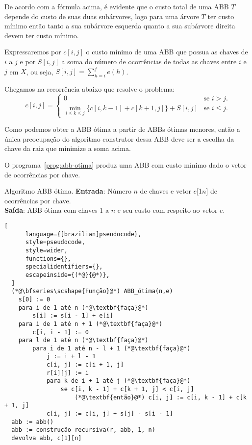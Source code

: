 
De acordo com a fórmula acima, é evidente que o custo total de uma ABB $T$ depende do custo de suas duas subárvores, logo para uma árvore $T$ ter custo mínimo então tanto a sua subárvore esquerda quanto a sua subárvore direita devem ter custo mínimo.

Expressaremos por $c[i,j]$ o custo mínimo de uma ABB que possua as chaves de $i$ a $j$ e por $S[i,j]$ a soma do número de ocorrências de todas as chaves entre $i$ e $j$ em $X$, ou seja, $S[i,j] = \sum_{h=i}^{j} e(h)$. %

Chegamos na recorrência abaixo que resolve o problema:
\[
c[i, j] = 
\begin{cases}
    0 & \text{se } i > j. \\
    \min_{i \leq k \leq j} \{ c[i, k - 1] + c[k + 1, j]\} + S[i, j] & \text{se } i \leq j.
\end{cases}
\]

Como podemos obter a ABB ótima a partir de ABBs ótimas menores, então a única preocupação do algoritmo construtor dessa ABB deve ser a escolha da chave da raiz que minimize a soma acima.

O programa~\ref{prog:abb-otima} produz uma ABB com custo mínimo dado o vetor de ocorrências por chave.

\begin{programruledcaption}{Algoritmo ABB ótima.\label{prog:abb-otima}}
  \noindent\textbf{Entrada}: Número $n$ de chaves e vetor $e$[1\tdots$n$] de ocorrências por chave. \\
  \textbf{Saída}: ABB ótima com chaves 1 a $n$ e seu custo com respeito ao vetor $e$.
  \vspace{-0.5\baselineskip}
  \begin{lstlisting}[
      language={[brazilian]pseudocode},
      style=pseudocode,
      style=wider,
      functions={},
      specialidentifiers={},
      escapeinside={(*@}{@*)},
  ]
  (*@\bfseries\scshape{Função}@*) ABB_ótima(n,e)
    s[0] := 0
    para i de 1 até n (*@\textbf{faça}@*)
        s[i] := s[i - 1] + e[i]
    para i de 1 até n + 1 (*@\textbf{faça}@*)
        c[i, i - 1] := 0
    para l de 1 até n (*@\textbf{faça}@*)
        para i de 1 até n - l + 1 (*@\textbf{faça}@*)
            j := i + l - 1
            c[i, j] := c[i + 1, j]
            r[i][j] := i
            para k de i + 1 até j (*@\textbf{faça}@*)
                se c[i, k - 1] + c[k + 1, j] < c[i, j]
                    (*@\textbf{então}@*) c[i, j] := c[i, k - 1] + c[k + 1, j]
            c[i, j] := c[i, j] + s[j] - s[i - 1]
  abb := abb()
  abb := construção_recursiva(r, abb, 1, n)
  devolva abb, c[1][n]
  \end{lstlisting}
  \vspace{-0.5\baselineskip}
\end{programruledcaption}


